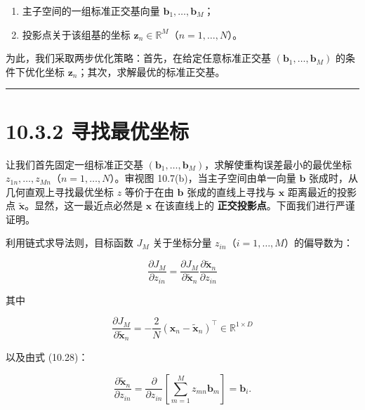 \begin{enumerate}
\item 主子空间的一组标准正交基向量 $ \boldsymbol{b}_1, \ldots, \boldsymbol{b}_M $；
\item 投影点关于该组基的坐标 $ \boldsymbol{z}_n \in \mathbb{R}^M $（$ n = 1, \ldots, N $）。
\end{enumerate}

为此，我们采取两步优化策略：首先，在给定任意标准正交基 $ (\boldsymbol{b}_1, \ldots, \boldsymbol{b}_M) $ 的条件下优化坐标 $ \boldsymbol{z}_n $；其次，求解最优的标准正交基。

\medskip\hrule\medskip

\section*{10.3.2 寻找最优坐标}

让我们首先固定一组标准正交基 $ (\boldsymbol{b}_1, \ldots, \boldsymbol{b}_M) $，求解使重构误差最小的最优坐标 $ z_{1n}, \ldots, z_{Mn} $（$ n = 1, \ldots, N $）。审视图 10.7(b)，当主子空间由单一向量 $ \boldsymbol{b} $ 张成时，从几何直观上寻找最优坐标 $ z $ 等价于在由 $ \boldsymbol{b} $ 张成的直线上寻找与 $ \boldsymbol{x} $ 距离最近的投影点 $ \tilde{\boldsymbol{x}} $。显然，这一最近点必然是 $ \boldsymbol{x} $ 在该直线上的 \textbf{正交投影点}。下面我们进行严谨证明。

利用链式求导法则，目标函数 $ J_M $ 关于坐标分量 $ z_{in} $（$ i = 1, \ldots, M $）的偏导数为：

\begin{equation}
\frac{\partial J_M}{\partial z_{in}} = \frac{\partial J_M}{\partial \tilde{\boldsymbol{x}}_n}\frac{\partial \tilde{\boldsymbol{x}}_n}{\partial z_{in}}
\tag{10.30a}
\end{equation}

其中

\begin{equation}
\frac{\partial J_M}{\partial \tilde{\boldsymbol{x}}_n} = -\frac{2}{N}(\boldsymbol{x}_n - \tilde{\boldsymbol{x}}_n)^\top \in \mathbb{R}^{1 \times D}
\tag{10.30b}
\end{equation}

以及由式 (10.28)：

\begin{equation}
\frac{\partial \tilde{\boldsymbol{x}}_n}{\partial z_{in}} = \frac{\partial}{\partial z_{in}}\left[ \sum_{m=1}^M z_{mn} \boldsymbol{b}_m \right] = \boldsymbol{b}_i .
\tag{10.30c}
\end{equation}

